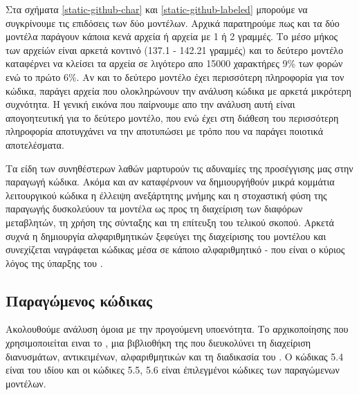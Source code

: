 Στα σχήματα \ref{static-github-char} και \ref{static-github-labeled} μπορούμε να συγκρίνουμε τις επιδόσεις των δύο μοντέλων.
Αρχικά παρατηρούμε πως και τα δύο μοντέλα παράγουν κάποια κενά αρχεία ή αρχεία με 1 ή 2 γραμμές.
Το μέσο μήκος των αρχείών είναι αρκετά κοντινό (137.1 - 142.21 γραμμές) και το δεύτερο μοντέλο καταφέρνει να κλείσει τα αρχεία σε λιγότερο απο 15000 χαρακτήρες 9\% των φορών ενώ το πρώτο 6\%.
Αν και το δεύτερο μοντέλο έχει περισσότερη πληροφορία για τον κώδικα, παράγει αρχεία που ολοκληρώνουν την ανάλυση κώδικα με αρκετά μικρότερη συχνότητα.
Η γενική εικόνα που παίρνουμε απο την ανάλυση αυτή είναι απογοητευτική για το δεύτερο μοντέλο, που ενώ έχει στη διάθεση του περισσότερη πληροφορία αποτυγχάνει να την αποτυπώσει με τρόπο που να παράγει ποιοτικά αποτελέσματα.

Τα είδη των συνηθέστερων λαθών μαρτυρούν τις αδυναμίες της προσέγγισης μας στην παραγωγή κώδικα.
Ακόμα και αν καταφέρνουν να δημιουργήθούν μικρά κομμάτια λειτουργικού κώδικα η έλλειψη ανεξάρτητης μνήμης και η στοχαστική φύση της παραγωγής δυσκολεύουν τα μοντέλα ως προς τη διαχείριση των διαφόρων μεταβλητών, τη χρήση της σύνταξης και τη επίτευξη του τελικού σκοπού.
Αρκετά συχνά η δημιουργία αλφαριθμητικών ξεφεύγει της διαχείρισης του μοντέλου και συνεχίζεται ναγράφεται κώδικας μέσα σε κάποιο αλφαριθμητικό - που είναι ο κύριος λόγος της ύπαρξης του .

\subsection{ Παραγώμενος κώδικας}

Ακολουθούμε ανάλυση όμοια με την προγούμενη υποενότητα.
Το  αρχικοποίησης που χρησιμοποιείται ειναι το , μια βιβλιοθήκη της  που διευκολύνει τη διαχείριση διανυσμάτων, αντικειμένων, αλφαριθμητικών και τη διαδικασία του . Ο κώδικας 5.4 είναι του ιδίου  και οι κώδικες 5.5, 5.6 είναι έπιλεγμένοι κώδικες των παραγώμενων μοντέλων. 
\pagebreak





\pagebreak



